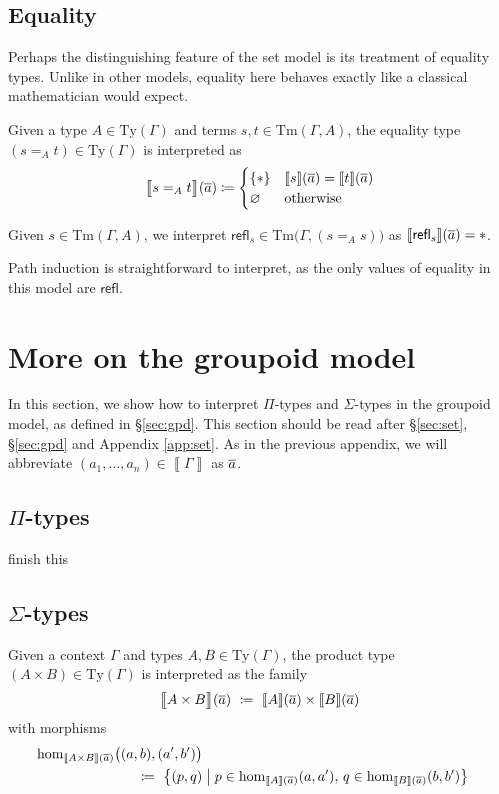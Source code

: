 \documentclass{article}
\theoremstyle{definition}
\renewcommand{\int}[1]{\mathopen{}\left\llbracket #1
    \right\rrbracket\mathclose{}}       %
\newcommand{\refl}{\mathsf{refl}}
\newcommand{\Ty}{\mathrm{Ty}}
\newcommand{\Tm}{\mathrm{Tm}}
\renewcommand{\hom}[3][]{\mathrm{hom}_{#1}\mathopen{}\left( #2, #3 \right)\mathclose{}}
\newcommand{\defeq}{
	\mathrel{\mathrel{\mathop:}\mkern-1.2mu=}}	%
\newcommand{\tup}[1]{\overline{\smash{#1}\vphantom{a}}}
\newcommand{\n}{%
}                %
\begin{document}
\subsection{Equality}

Perhaps the distinguishing feature of the set model is its treatment of equality types. Unlike in other models, equality here behaves exactly like a classical mathematician would expect.

Given a type $A \in \Ty(\Gamma)$ and terms $s, t \in \Tm(\Gamma, A)$, the equality type $(s =_A t) \in \Ty(\Gamma)$ is interpreted as
$$\int{\big.s =_A t}\n(\tup{a}) \defeq \begin{cases}
    \{ * \} & \int{s}(\tup{a}) = \int{t}(\tup{a}) \\
    \varnothing & \text{otherwise}
\end{cases}$$

Given $s \in \Tm(\Gamma,A)$, we interpret $\refl_s \in \Tm\big(\Gamma, (s =_A s) \big)$ as $\int{\refl_s}(\tup{a}) = *$.

Path induction is straightforward to interpret, as the only values of equality in this model are $\refl$.


\section{More on the groupoid model}
\label{app:gpd}

In this section, we show how to interpret $\Pi$-types and $\Sigma$-types in the groupoid model, as defined in \S\ref{sec:gpd}. This section should be read after \S\ref{sec:set}, \S\ref{sec:gpd} and Appendix \ref{app:set}. As in the previous appendix, we will abbreviate $(a_1,\ldots,a_n) \in \int{\Gamma}$ as $\tup{a}$.


\subsection{\texorpdfstring{$\Pi$}{Pi}-types}

{\color{red} finish this}


\subsection{\texorpdfstring{$\Sigma$}{Sigma}-types}

Given a context $\Gamma$ and types $A, B \in \Ty(\Gamma)$, the product type $(A \times B) \in \Ty(\Gamma)$ is interpreted as the family
$$\int{\big.A \times B}\n(\tup{a})\ \defeq\ \int{A}\n(\tup{a}) \times \int{B}\n(\tup{a})$$
with morphisms
\begin{align*}
    \hom[\int{A \times B}(\tup{a})]{\big.(a,b)}{(a',b')}\\ \defeq\ \big\{ (p,q)& \mathrel{\big|} p \in \hom[\int{A}(\tup{a})]{a}{a'},\, q \in \hom[\int{B}(\tup{a})]{b}{b'} \big\}
\end{align*}
\end{document}
